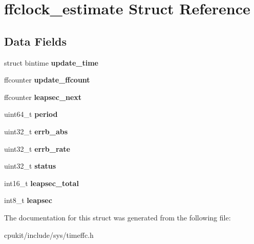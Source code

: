 \hypertarget{structffclock__estimate}{}\section{ffclock\+\_\+estimate Struct Reference}
\label{structffclock__estimate}
\subsection*{Data Fields}
\begin{DoxyCompactItemize}
\item 
\mbox{\label{structffclock__estimate_ad2777288c9324d703f60460519010dff}} 
struct bintime {\bfseries update\+\_\+time}
\item 
\mbox{\label{structffclock__estimate_a1783a3cf7b466ea281603ec27b7749a7}} 
ffcounter {\bfseries update\+\_\+ffcount}
\item 
\mbox{\label{structffclock__estimate_a23aa2a59df96a43d5f6a5917c59bd7fc}} 
ffcounter {\bfseries leapsec\+\_\+next}
\item 
\mbox{\label{structffclock__estimate_adaafc7f0e3b303f512800342b2c8f451}} 
uint64\+\_\+t {\bfseries period}
\item 
\mbox{\label{structffclock__estimate_a2d56b3db5e14c17a44e61fb5458ce068}} 
uint32\+\_\+t {\bfseries errb\+\_\+abs}
\item 
\mbox{\label{structffclock__estimate_a839fb9d0adf2dfbb1c66f24cfd999a15}} 
uint32\+\_\+t {\bfseries errb\+\_\+rate}
\item 
\mbox{\label{structffclock__estimate_a5df0107a29d6b80d4b5bf669a77bfe2d}} 
uint32\+\_\+t {\bfseries status}
\item 
\mbox{\label{structffclock__estimate_a5b750cf0980166fdcc4972462fa99d05}} 
int16\+\_\+t {\bfseries leapsec\+\_\+total}
\item 
\mbox{\label{structffclock__estimate_aa7e7fde2a468ef1eb2398e2ff8e29fda}} 
int8\+\_\+t {\bfseries leapsec}
\end{DoxyCompactItemize}


The documentation for this struct was generated from the following file\+:\begin{DoxyCompactItemize}
\item 
cpukit/include/sys/timeffc.\+h\end{DoxyCompactItemize}
